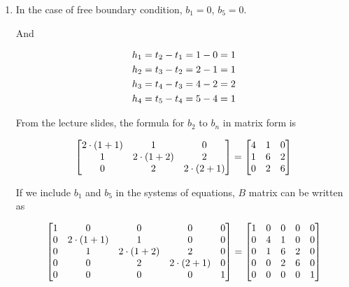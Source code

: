 \documentclass[12pt, xcolor=dvipsnames,svgnames,x11names]{article}
\makeatletter
\newenvironment{multiequation}[1][]{%
\begin{equation}%
   \begin{aligned}%
   \ifx#1\@empty\else\label{#1}\fi%
}{%
   \end{aligned}%
\end{equation}%
}
\makeatother
\begin{document}
\begin{answerbox}

\begin{enumerate}

\item 

In the case of free boundary condition, $b_1 = 0$, $b_5 = 0$.

And

\begin{multiequation}
h_1 & = t_2 - t_1 = 1 - 0 = 1\\
h_2 & = t_3 - t_2 = 2 - 1  = 1\\
h_3 & = t_4 - t_3 = 4 - 2 = 2\\
h_4 & = t_5 - t_4 = 5 - 4 = 1
\end{multiequation}

From the lecture slides, the formula for $b_2$ to $b_n$ in matrix form is

\begin{multiequation}
\begin{bmatrix}
2\cdot(1+1) & 1 & 0 \\
1 & 2\cdot(1+2) & 2\\
0 & 2 & 2\cdot(2+1)\\
\end{bmatrix}  = \begin{bmatrix}
4  &   1  &  0\\
1  &   6  &  2\\
0  &   2  &   6
\end{bmatrix}
\end{multiequation}

If we include $b_1$ and $b_5$ in the systems of equations, $B$ matrix can be written as

\begin{multiequation}
\begin{bmatrix}
1 & 0 & 0 & 0 & 0\\
0 & 2\cdot(1+1) & 1 & 0 & 0 \\
0 & 1 & 2\cdot(1+2) & 2 & 0\\
0 & 0 & 2 & 2\cdot(2+1) & 0\\
0 & 0 & 0 & 0 & 1
\end{bmatrix}  = \begin{bmatrix}
1 & 0 & 0 & 0 & 0\\
0 & 4  &   1  &  0 & 0\\
0 & 1  &   6  &  2 & 0\\
0 & 0  &   2  &   6 & 0\\
0 & 0 & 0 & 0 & 1
\end{bmatrix}
\end{multiequation}


\end{enumerate}
\end{answerbox}
\end{document}
